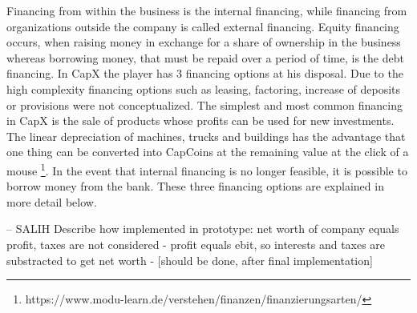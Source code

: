 Financing from within the business is the internal financing, while financing from organizations outside the company is called external financing. Equity financing occurs, when raising money in exchange for a share of ownership in the business whereas borrowing money, that must be repaid over a period of time, is the debt financing. 
In CapX the player has 3 financing options at his disposal. Due to the high complexity financing options such as leasing, factoring, increase of deposits or provisions were not conceptualized. 
The simplest and most common financing in CapX is the sale of products whose profits can be used for new investments. The linear depreciation of machines, trucks and buildings has the advantage that one thing can be converted into CapCoins at the remaining value at the click of a mouse \footnote{https://www.modu-learn.de/verstehen/finanzen/finanzierungsarten/}.
In the event that internal financing is no longer feasible, it is possible to borrow money from the bank. These three financing options are explained in more detail below.

– SALIH
Describe how implemented in prototype: net worth of company equals profit, taxes are not considered - profit equals ebit, so interests and taxes are substracted to get net worth - [should be done, after final implementation]